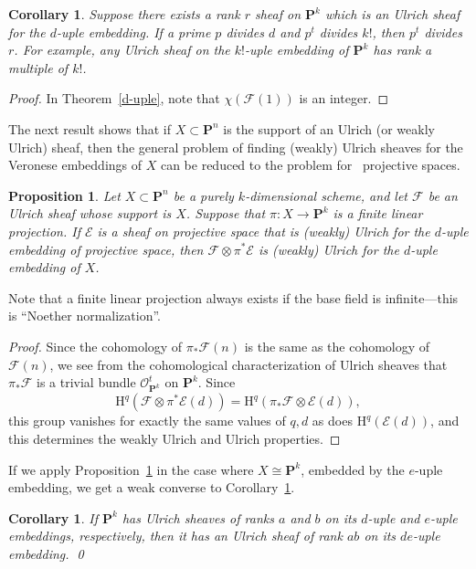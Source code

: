 \documentclass{jams-l}
\newtheorem{proposition}[theorem]{Proposition}
\newtheorem{corollary}[theorem]{Corollary}
\theoremstyle{definition}
\theoremstyle{remark}
\newcommand{\E} {{\mathcal E}}
\newcommand{\F}{{\mathcal F}}
\newcommand{\Hrm}{{\mathrm H}}
\newcommand{\Ocal}{{\mathcal O}}
\newcommand{\PP}{{\mathbf P}}
\newcommand{\iso}{\cong}
\begin{document}
\begin{corollary}\label{divisibility} Suppose there exists a rank $r$ sheaf on
$\PP^k$ which is an Ulrich sheaf for the $d$-uple embedding.
If a prime $p$ divides $d$ and $p^t$ divides $k!$,
then $p^t$ divides $r$. For example, 
any Ulrich sheaf on the $k!$-uple embedding of $\PP^k$
has rank a multiple of $k!$.
\end{corollary}

\begin{proof} In Theorem~\ref{d-uple}, note that $\chi(\F(1))$
is an integer.
\end{proof}

The next result shows that if $X\subset \PP^n$
is the support of an Ulrich (or weakly Ulrich)
sheaf, then the general problem of finding (weakly) Ulrich sheaves for the
Veronese embeddings of $X$ can be reduced to the problem for
\pagebreak\ projective spaces. 

\begin{proposition}\label{general veronese} Let $X\subset \PP^n$ be
a purely $k$-dimensional scheme, and let $\F$ be an
Ulrich sheaf whose support is $X$. Suppose that
$\pi: X\to \PP^k$ is a finite linear projection. If 
$\E$ is a sheaf on projective space that is (weakly)
Ulrich for the $d$-uple embedding of projective space,
then $\F\otimes \pi^*\E$ is (weakly) Ulrich for the 
$d$-uple embedding of $X$.
\end{proposition}

Note that a finite linear projection always
exists if the base field is infinite---this is
``Noether normalization''.

\begin{proof} Since the cohomology of  $\pi_*\F(n)$ is the same as
the cohomology of $\F(n)$, we see from the cohomological 
characterization of Ulrich sheaves that $\pi_*\F$ is a trivial
bundle $\Ocal_{\PP^k}^t$ on $\PP^k$. Since
\[
\Hrm^q(\F\otimes \pi^*\E(d))=\Hrm^q(\pi_*\F\otimes \E(d)),
\]
this group vanishes for exactly the same values of $q,d$ as
does $\Hrm^q(\E(d))$, and this determines the weakly Ulrich and 
Ulrich properties.
\end{proof}

If we apply Proposition~\ref{general veronese} 
in the case where $X\iso \PP^k$, embedded by the $e$-uple
embedding, we get a weak converse to Corollary~\ref{divisibility}.

\begin{corollary}\label{semigroup Ulrich} If $\PP^k$ has Ulrich sheaves of
ranks $a$ and $b$ on its
$d$-uple and $e$-uple embeddings, respectively, then it has an Ulrich
sheaf of rank $ab$ on its $de$-uple embedding.
\qed
\end{corollary}
\end{document}

